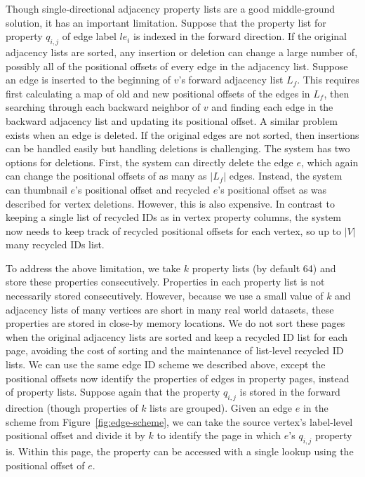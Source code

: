  Though single-directional adjacency property lists are a good middle-ground solution, it has an important limitation. Suppose that the property list for property $q_{i,j}$ of edge label $le_i$ is indexed in the forward direction. If the original adjacency lists are sorted,  any insertion or deletion can change a large number of, possibly all of the positional offsets of every edge in the adjacency list. Suppose an edge is inserted to the beginning of $v$'s forward adjacency list $L_f$. This requires first calculating a map of old and new positional offsets of the edges in $L_f$, then searching through each backward neighbor of $v$ and finding each edge in the backward adjacency list and updating its positional offset. A similar problem exists when an edge is deleted. If the original edges are not sorted, then insertions can be handled easily but handling deletions is challenging. The system has two options for deletions. First, the system can directly delete the edge $e$, which again can change the positional offsets of as many as $|L_f|$ edges. Instead, the system can thumbnail $e$'s positional offset and recycled $e$'s positional offset as was described for vertex deletions. However, this is also expensive. In contrast to keeping a single list of recycled IDs as in vertex property columns, the system now needs to keep track of recycled positional offsets for each vertex, so up to $|V|$ many recycled IDs list.


 To address the above limitation, 
we take $k$ property lists (by default 64) and store these properties consecutively. Properties in each property list is not necessarily stored consecutively. However, because we use a small value of $k$ and adjacency lists of many vertices are short in many real world datasets, these properties are stored in close-by memory locations. We do not sort these pages when the original adjacency lists are sorted and keep a recycled ID list for each page, avoiding the cost of sorting and the maintenance of list-level recycled ID lists. We can use the same edge ID scheme we described above, except the positional offsets now identify the properties of edges in property pages, instead of property lists. Suppose again that the property $q_{i, j}$ is stored in the forward direction (though properties of $k$ lists are grouped). Given an edge $e$ in the scheme from Figure~\ref{fig:edge-scheme}, we can take the source vertex's label-level positional offset and divide it by $k$ to identify the page in which $e$'s $q_{i, j}$ property is. Within this page, the property can be accessed with a single lookup using the positional offset of $e$.

